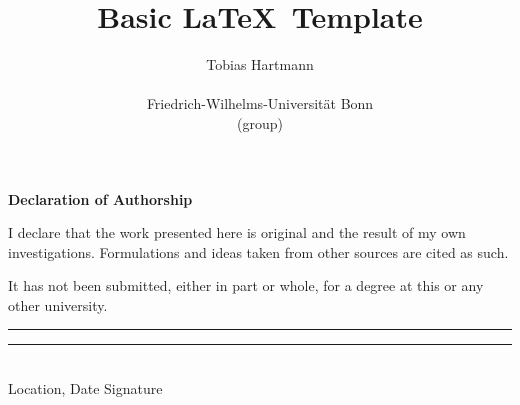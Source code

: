 \pagestyle{headings}  %
\title{Basic \LaTeX \, Template}
\author{Tobias Hartmann\\ \begin{minipage}{8cm}\centering \small Friedrich-Wilhelms-Universität Bonn\\ \small (group)\end{minipage}}

\vspace{4cm}

\cleardoublepage
\thispagestyle{empty}
{\noindent%
    \huge{\textbf{\textsf{Declaration of Authorship}}}
}
\vspace{2cm}
\begin{flushleft}
    \noindent%
    I declare that the work presented here is original and the result of my own investigations.
    Formulations and ideas taken from other sources are cited as such.

    It has not been submitted, either in part or whole, for a degree at this or any other university.
\end{flushleft}

\vspace{8cm}
\noindent%
\rule[1em]{8em}{0.5pt}  \hfill \rule[1em]{8em}{0.5pt}\\ %
Location, Date \hfill Signature\\


\cleardoublepage
